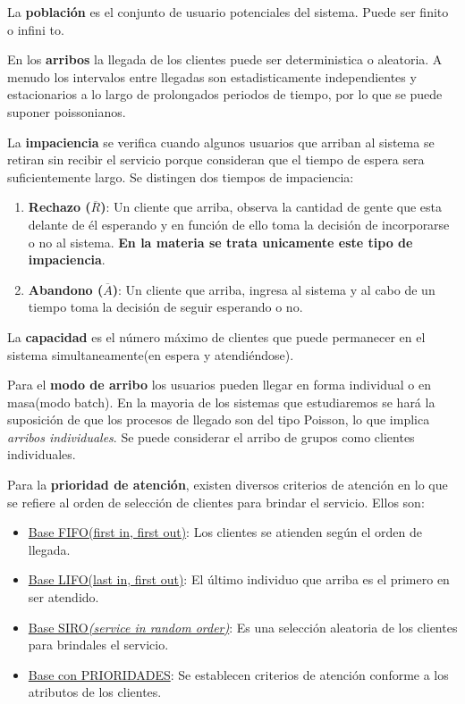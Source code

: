\documentclass{article}
\begin{document}
La \textbf{población} es el conjunto de usuario potenciales del sistema. Puede ser finito o infini  to.

En los \textbf{arribos} la llegada de los clientes puede ser deterministica o aleatoria. A menudo los intervalos entre llegadas son estadisticamente independientes y estacionarios a lo largo de prolongados periodos de tiempo, por lo que se puede suponer poissonianos.

La \textbf{impaciencia} se verifica cuando algunos usuarios que arriban al sistema se retiran sin recibir el servicio porque consideran que el tiempo de espera sera suficientemente largo. Se distingen dos tiempos de impaciencia:
\begin{enumerate}
    \item \textbf{Rechazo ($\overline{R}$)}: Un cliente que arriba, observa la cantidad de gente que esta delante de él esperando y en función de ello toma la decisión de incorporarse o no al sistema. \textbf{En la materia se trata unicamente este tipo de impaciencia}.
    \item \textbf{Abandono ($\overline{A}$)}: Un cliente que arriba, ingresa al sistema y al cabo de un tiempo toma la decisión de seguir esperando o no.
\end{enumerate}

La \textbf{capacidad} es el número máximo de clientes que puede permanecer en el sistema simultaneamente(en espera y atendiéndose).

Para el \textbf{modo de arribo} los usuarios pueden llegar en forma individual o en masa(modo batch). En la mayoria de los sistemas que estudiaremos se hará la suposición de que los procesos de llegado son del tipo Poisson, lo que implica \textit{arribos individuales}. Se puede considerar el arribo de grupos como clientes individuales. 

Para la \textbf{prioridad de atención}, existen diversos criterios de atención en lo que se refiere al orden de selección de clientes para brindar el servicio. Ellos son:

\begin{itemize}
    \item \underline{Base FIFO{(first in, first out)}}: Los clientes se atienden según el orden de llegada.
    \item \underline{Base LIFO{(last in, first out)}}: El último individuo que arriba es el primero en ser atendido.
    \item \underline{Base SIRO\textit{(service in random order)}}: Es una selección aleatoria de los clientes para brindales el servicio. 
    \item \underline{Base con PRIORIDADES}: Se establecen criterios de atención conforme a los atributos de los clientes. 
\end{itemize}
\end{document}
